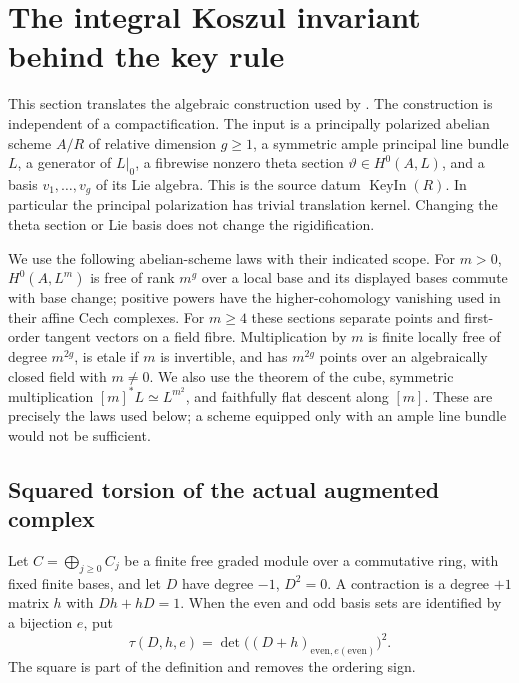 \section{The integral Koszul invariant behind the key rule}
\label{sec:ftb-koszul-key}
This section translates the algebraic construction used by
.
The construction is independent of a compactification.
The input is a principally polarized abelian scheme \(A/R\) of
relative dimension \(g\geq1\), a symmetric ample principal line bundle
\(L\), a generator of \(L|_0\), a fibrewise nonzero theta section
\(\vartheta\in H^0(A,L)\), and a basis \(v_1,\ldots,v_g\) of its Lie
algebra.  This is the source datum \(\operatorname{KeyIn}(R)\).
In particular the principal polarization has trivial translation
kernel.  Changing the theta section or Lie basis does not change the
rigidification.

We use the following abelian-scheme laws with their indicated scope.
For \(m>0\), \(H^0(A,L^m)\) is free of rank \(m^g\) over a local base
and its displayed bases commute with base change; positive powers have
the higher-cohomology vanishing used in their affine Cech complexes.
For \(m\geq4\) these sections separate points and first-order tangent
vectors on a field fibre.  Multiplication by \(m\) is finite locally
free of degree \(m^{2g}\), is etale if \(m\) is invertible, and has
\(m^{2g}\) points over an algebraically closed field with \(m\ne0\).
We also use the theorem of the cube, symmetric multiplication
\([m]^*L\simeq L^{m^2}\), and faithfully flat descent along \([m]\).
These are precisely the laws used below; a scheme equipped only with
an ample line bundle would not be sufficient.

\subsection{Squared torsion of the actual augmented complex}
Let \(C=\bigoplus_{j\geq0}C_j\) be a finite free graded module over a
commutative ring, with fixed finite bases, and let \(D\) have degree
\(-1\), \(D^2=0\).
A contraction is a degree \(+1\) matrix \(h\) with \(Dh+hD=1\).
When the even and odd basis sets are identified by a bijection \(e\),
put
\[
 \tau(D,h,e)
  =\det\bigl((D+h)_{\mathrm{even},e(\mathrm{even})}\bigr)^2.
 \tag{K1}\label{eq:ftb-torsion-square}
\]
The square is part of the definition and removes the ordering sign.

